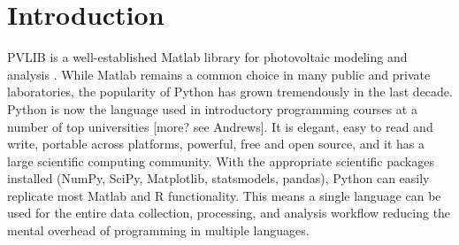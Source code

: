 \documentclass[conference]{IEEEtran}
\begin{document}
%



\section{Introduction}

PVLIB is a well-established Matlab library for photovoltaic modeling and analysis \cite{pvlibstein}. 
While Matlab remains a common choice in many public and private laboratories, the popularity of Python has grown tremendously in the last decade. 
Python is now the language used in introductory programming courses at a number of top universities \cite{acmpython}[more? see Andrews]. 
It is elegant, easy to read and write, portable across platforms, powerful, free and open source, and it has a large scientific computing community. 
With the appropriate scientific packages installed (NumPy, SciPy, Matplotlib, statsmodels, pandas), Python can easily replicate most Matlab and R functionality. 
This means a single language can be used for the entire data collection, processing, and analysis workflow reducing the mental overhead of programming in multiple languages. 
\end{document}
